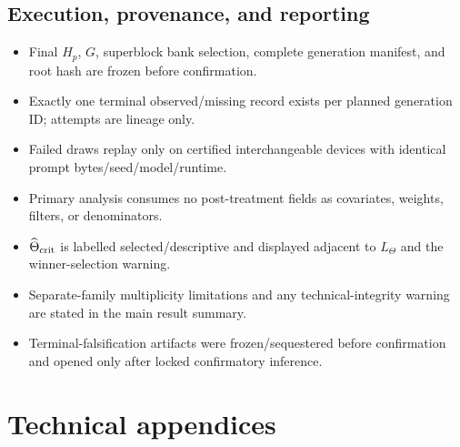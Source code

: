 \documentclass[11pt,a4paper]{article}
\begin{document}
\subsection{Execution, provenance, and reporting}
\begin{itemize}
\item[$\square$] Final $H_p$, $G$, superblock bank selection, complete generation manifest, and root hash are frozen before confirmation.
\item[$\square$] Exactly one terminal observed/missing record exists per planned generation ID; attempts are lineage only.
\item[$\square$] Failed draws replay only on certified interchangeable devices with identical prompt bytes/seed/model/runtime.
\item[$\square$] Primary analysis consumes no post-treatment fields as covariates, weights, filters, or denominators.
\item[$\square$] $\widehat\Theta_{\rm crit}$ is labelled selected/descriptive and displayed adjacent to $L_\Theta$ and the winner-selection warning.
\item[$\square$] Separate-family multiplicity limitations and any technical-integrity warning are stated in the main result summary.
\item[$\square$] Terminal-falsification artifacts were frozen/sequestered before confirmation and opened only after locked confirmatory inference.
\end{itemize}

\section{Technical appendices}
\end{document}
